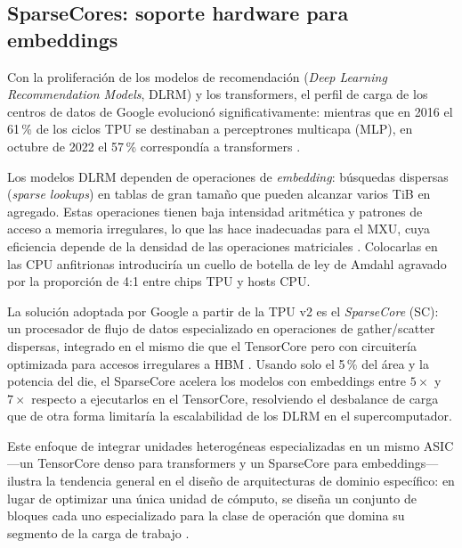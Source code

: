 \documentclass[conference]{IEEEtran}
\begin{document}
\subsection{SparseCores: soporte hardware para embeddings}

Con la proliferación de los modelos de recomendación (\textit{Deep Learning Recommendation Models}, DLRM) y los transformers, el perfil de carga de los centros de datos de Google evolucionó significativamente: mientras que en 2016 el 61\,\% de los ciclos TPU se destinaban a perceptrones multicapa (MLP), en octubre de 2022 el 57\,\% correspondía a transformers \cite{jouppi2023tpuv4}.

Los modelos DLRM dependen de operaciones de \textit{embedding}: búsquedas dispersas (\textit{sparse lookups}) en tablas de gran tamaño que pueden alcanzar varios TiB en agregado. Estas operaciones tienen baja intensidad aritmética y patrones de acceso a memoria irregulares, lo que las hace inadecuadas para el MXU, cuya eficiencia depende de la densidad de las operaciones matriciales \cite{jouppi2023tpuv4}. Colocarlas en las CPU anfitrionas introduciría un cuello de botella de ley de Amdahl agravado por la proporción de 4:1 entre chips TPU y hosts CPU.

La solución adoptada por Google a partir de la TPU v2 es el \textit{SparseCore} (SC): un procesador de flujo de datos especializado en operaciones de gather/scatter dispersas, integrado en el mismo die que el TensorCore pero con circuitería optimizada para accesos irregulares a HBM \cite{jouppi2023tpuv4}. Usando solo el 5\,\% del área y la potencia del die, el SparseCore acelera los modelos con embeddings entre $5\times$ y $7\times$ respecto a ejecutarlos en el TensorCore, resolviendo el desbalance de carga que de otra forma limitaría la escalabilidad de los DLRM en el supercomputador.

Este enfoque de integrar unidades heterogéneas especializadas en un mismo ASIC —un TensorCore denso para transformers y un SparseCore para embeddings— ilustra la tendencia general en el diseño de arquitecturas de dominio específico: en lugar de optimizar una única unidad de cómputo, se diseña un conjunto de bloques cada uno especializado para la clase de operación que domina su segmento de la carga de trabajo \cite{jouppi2023tpuv4}.

\end{document}
